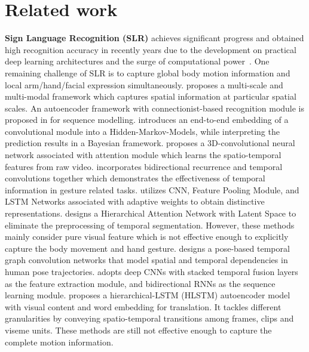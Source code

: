 \documentclass[final]{cvpr}
\begin{document}
\section{Related work}
\noindent\textbf{Sign Language Recognition (SLR)} achieves significant progress and obtained high recognition accuracy in recently years due to the development on practical deep learning architectures and the surge of computational power~\cite{sincan2019isolated,li2020word,pigou2018beyond,tur2019isolated,huang2018video,huang2018attention,lim2019isolated,li2018deep,shi2018american}. One remaining challenge of SLR is to capture global body motion information and local arm/hand/facial expression simultaneously. \cite{neverova2015moddrop} proposes a multi-scale and multi-modal framework which captures spatial information at particular spatial scales. An autoencoder framework with connectionist-based recognition module is proposed in \cite{pu2019iterative} for sequence modelling. \cite{koller2018deep} introduces an end-to-end embedding of a convolutional module into a Hidden-Markov-Models, while interpreting the prediction results in a Bayesian framework.  \cite{huang2018attention} proposes a 3D-convolutional neural network associated with attention module which learns the spatio-temporal features from raw video. \cite{pigou2018beyond} incorporates bidirectional recurrence and temporal convolutions together which demonstrates the effectiveness of temporal information in gesture related tasks. \cite{sincan2019isolated} utilizes CNN, Feature Pooling Module, and LSTM Networks associated with adaptive weights to obtain distinctive representations. \cite{huang2018video} designs a Hierarchical Attention Network with Latent Space to eliminate the preprocessing of temporal segmentation. However, these methods mainly consider pure visual feature which is not effective enough to explicitly capture the body movement and hand gesture. \cite{li2020word} designs a pose-based temporal graph convolution networks that model spatial and temporal dependencies in human pose trajectories. \cite{cui2019deep} adopts deep CNNs with stacked temporal fusion layers as the feature extraction module, and bidirectional RNNs as the sequence learning module. \cite{guo2018hierarchical} proposes a hierarchical-LSTM (HLSTM) autoencoder model with visual content and word embedding for translation. It tackles different granularities by conveying spatio-temporal transitions among frames, clips and viseme units. These methods are still not effective enough to capture the complete motion information. 
\end{document}
